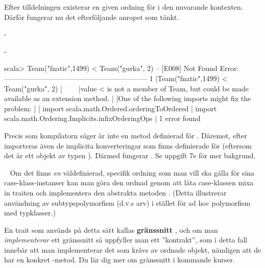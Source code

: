 Efter tilldelningen  existerar en given ordning för  i den nuvarande kontexten. 
Därför fungerar nu det efterföljande anropet  som tänkt.

\SubtaskSolved 
-

\SubtaskSolved
-

\SubtaskSolved
\begin{REPLnonum}
scala> Team("fnatic",1499) < Team("gurka", 2)
-- [E008] Not Found Error: ------------------------------------------------------------
1 |Team("fnatic",1499) < Team("gurka", 2)
  |^^^^^^^^^^^^^^^^^^^^^
  |value < is not a member of Team, but could be made available as an extension method.
  |
  |One of the following imports might fix the problem:
  |
  |  import scala.math.Ordered.orderingToOrdered
  |  import scala.math.Ordering.Implicits.infixOrderingOps
  |
1 error found
\end{REPLnonum}
Precis som kompilatorn säger är \code{<} inte en metod definierad för .
Däremot, efter  importeras även de implicita konverteringar som finns definierade för  (eftersom det är ett objekt av typen ).
Därmed fungerar \code{<}. Se uppgift 7e för mer bakgrund.


\QUESTEND







\QUESTBEGIN

\Task  \what~  Om det finns \emph{en} väldefinierad, specifik ordning som man vill ska gälla för sina case-klass-instanser kan man göra den ordnad genom att låta case-klassen mixa in traiten  och implementera den abstrakta metoden . (Detta illustrerar användning av subtypspolymorfism (d.v.s arv) i stället för ad hoc polymorfism med typklasser.)

\begin{Background}
En trait som används på detta sätt kallas \textbf{gränssnitt} , och om man \emph{implementerar} ett gränssnitt så uppfyller man ett ''kontrakt'', som i detta fall innebär att man implementerar det som krävs av ordnade objekt, nämligen att de har en konkret -metod. Du lär dig mer om gränssnitt i kommande kurser.
\end{Background}

